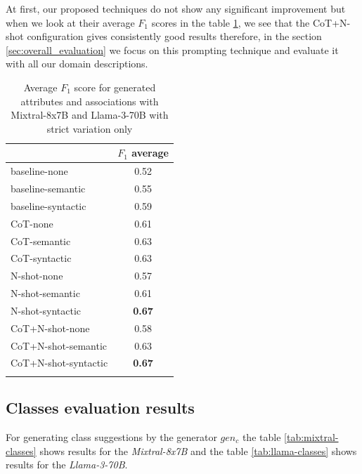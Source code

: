 At first, our proposed techniques do not show any significant improvement but when we look at their average $F_1$ scores in the table \ref{tab:F1_attributes_associations_average}, we see that the CoT+N-shot configuration gives consistently good results therefore, in the section \ref{sec:overall_evaluation} we focus on this prompting technique and evaluate it with all our domain descriptions.


\begin{table}[!h]
    \scriptsize
    \centering
    \setlength{\tabcolsep}{0.5em}
    \begin{tabular}{lc}
     \toprule
         & $F_1$ average \\
    \toprule
    
    \addlinespace
    baseline-none  & 0.52  \\
    baseline-semantic  & 0.55  \\
    baseline-syntactic  & 0.59  \\
    CoT-none	& 0.61  \\
    CoT-semantic & 0.63  \\
    CoT-syntactic & 0.63  \\
    N-shot-none & 0.57 \\
    N-shot-semantic & 0.61 \\
    N-shot-syntactic & \textbf{0.67} \\
    CoT+N-shot-none & 0.58 \\
    CoT+N-shot-semantic & 0.63 \\
    CoT+N-shot-syntactic & \textbf{0.67} \\
    \addlinespace
    \bottomrule
    \addlinespace
    \end{tabular}
    \caption{Average $F_1$ score for generated attributes and associations with Mixtral-8x7B and Llama-3-70B with strict variation only}
    \label{tab:F1_attributes_associations_average}
\end{table}


\subsection{Classes evaluation results}

For generating class suggestions by the generator $gen_c$ the table \ref{tab:mixtral-classes} shows results for the \emph{Mixtral-8x7B} and the table \ref{tab:llama-classes} shows results for the \emph{Llama-3-70B}.

